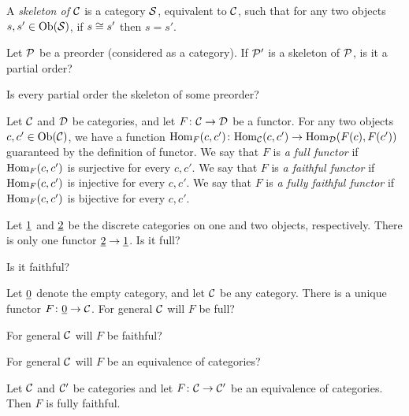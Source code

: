 \documentclass[CT4S-EN-RU]{subfiles}
\begin{document}
\begin{definition}

A {\em skeleton of $\mathcal{C}$} is a category $\mathcal{S}$, equivalent to $\mathcal{C}$, such that for any two objects $s,s'\in\textnormal{Ob}(\mathcal{S})$, if $s\cong s'$ then $s=s'$. 

\end{definition}

\begin{exercise}
Let $\mathcal{P}$ be a preorder (considered as a category).
\sexc If $\mathcal{P}'$ is a skeleton of $\mathcal{P}$, is it a partial order?
\item Is every partial order the skeleton of some preorder?
\endsexc
\end{exercise}

\begin{definition}\label{def:full faithful}

Let $\mathcal{C}$ and $\mathcal{D}$ be categories, and let $F\colon\mathcal{C}\rightarrow\mathcal{D}$ be a functor. For any two objects $c,c'\in\textnormal{Ob}(\mathcal{C})$, we have a function $\textnormal{Hom}_F(c,c')\colon\textnormal{Hom}_\mathcal{C}(c,c')\rightarrow\textnormal{Hom}_\mathcal{D}(F(c),F(c'))$ guaranteed by the definition of functor.
We say that $F$ is {\em a full functor} if $\textnormal{Hom}_F(c,c')$ is surjective for every $c,c'$.
We say that $F$ is {\em a faithful functor} if $\textnormal{Hom}_F(c,c')$ is injective for every $c,c'$. We say that $F$ is {\em a fully faithful functor} if $\textnormal{Hom}_F(c,c')$ is bijective for every $c,c'$.

\end{definition}

\begin{exercise}
Let $\underline{1}$ and $\underline{2}$ be the discrete categories on one and two objects, respectively. There is only one functor $\underline{2}\rightarrow\underline{1}$.
\sexc Is it full?
\item Is it faithful?
\endsexc
\end{exercise}

\begin{exercise}\label{exc:empty fully faithful}
Let $\underline{0}$ denote the empty category, and let $\mathcal{C}$ be any category. There is a unique functor $F\colon \underline{0}\rightarrow\mathcal{C}$.
\sexc For general $\mathcal{C}$ will $F$ be full?
\item For general $\mathcal{C}$ will $F$ be faithful?
\item For general $\mathcal{C}$ will $F$ be an equivalence of categories?
\endsexc
\end{exercise}

\begin{proposition}

Let $\mathcal{C}$ and $\mathcal{C}'$ be categories and let $F\colon\mathcal{C}\rightarrow\mathcal{C}'$ be an equivalence of categories. Then $F$ is fully faithful.

\end{proposition}
\end{document}

